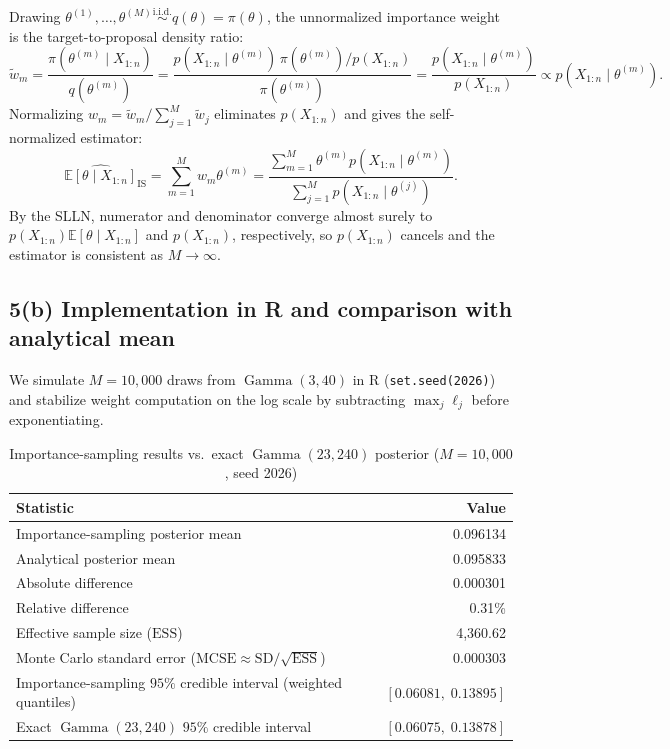 \documentclass[11pt,a4paper]{article}
\begin{document}
Drawing $\theta^{(1)}, \dots, \theta^{(M)} \stackrel{\text{i.i.d.}}{\sim} q(\theta) = \pi(\theta)$, the unnormalized importance weight is the target-to-proposal density ratio:
\[
\tilde{w}_m
= \frac{\pi(\theta^{(m)} \mid X_{1:n})}{q(\theta^{(m)})}
= \frac{p(X_{1:n} \mid \theta^{(m)})\,\pi(\theta^{(m)}) / p(X_{1:n})}{\pi(\theta^{(m)})}
= \frac{p(X_{1:n} \mid \theta^{(m)})}{p(X_{1:n})}
\propto p(X_{1:n} \mid \theta^{(m)}).
\]
Normalizing $w_m = \tilde{w}_m / \sum_{j=1}^{M} \tilde{w}_j$ eliminates $p(X_{1:n})$ and gives the self-normalized estimator:
\[
\boxed{\widehat{\mathbb{E}[\theta \mid X_{1:n}]}_{\mathrm{IS}}
= \sum_{m=1}^{M} w_m \theta^{(m)}
= \frac{\sum_{m=1}^{M} \theta^{(m)} p(X_{1:n} \mid \theta^{(m)})}{\sum_{j=1}^{M} p(X_{1:n} \mid \theta^{(j)})}.}
\]
By the SLLN, numerator and denominator converge almost surely to $p(X_{1:n})\mathbb{E}[\theta \mid X_{1:n}]$ and $p(X_{1:n})$, respectively, so $p(X_{1:n})$ cancels and the estimator is consistent as $M \to \infty$.

\subsection*{5(b) Implementation in R and comparison with analytical mean}

We simulate $M = 10{,}000$ draws from $\operatorname{Gamma}(3, 40)$ in R (\texttt{set.seed(2026)}) and stabilize weight computation on the log scale by subtracting $\max_j \ell_j$ before exponentiating.

\begin{table}[ht]
\centering
\caption{Importance-sampling results vs.\ exact $\operatorname{Gamma}(23, 240)$ posterior ($M = 10{,}000$, seed 2026)}
\label{tab:is_results}
\begin{tabular}{lr}
\toprule
Statistic & Value \\
\midrule
Importance-sampling posterior mean & 0.096134 \\
Analytical posterior mean & 0.095833 \\
Absolute difference & 0.000301 \\
Relative difference & 0.31\% \\
Effective sample size ($\mathrm{ESS}$) & 4,360.62 \\
Monte Carlo standard error ($\mathrm{MCSE} \approx \mathrm{SD}/\sqrt{\mathrm{ESS}}$) & 0.000303 \\
Importance-sampling $95\%$ credible interval (weighted quantiles) & $[0.06081,\; 0.13895]$ \\
Exact $\operatorname{Gamma}(23, 240)$ $95\%$ credible interval & $[0.06075,\; 0.13878]$ \\
\bottomrule
\end{tabular}
\end{table}
\end{document}
